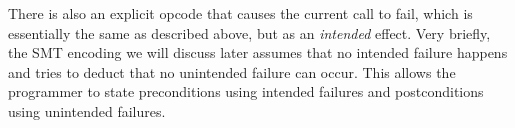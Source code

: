 There is also an explicit opcode that causes the current call to fail, which is
essentially the same as described above, but as an \emph{intended} effect.
%
Very briefly, the SMT encoding we will discuss later assumes that no intended
failure happens and tries to deduct that no unintended failure can occur. This
allows the programmer to state preconditions using intended failures and
postconditions using unintended failures.

